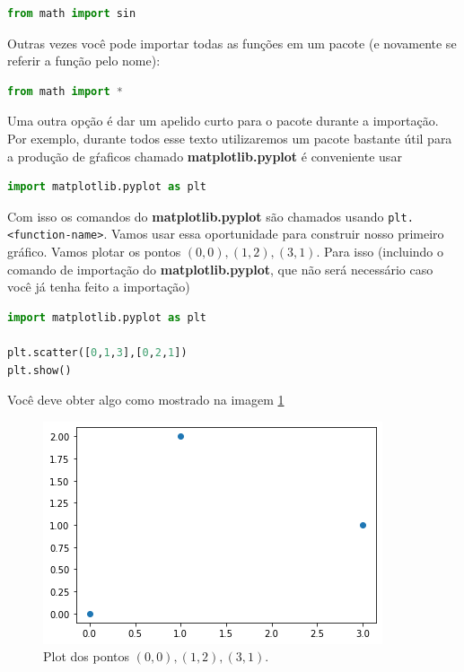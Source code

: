  \begin{lstlisting}[language=Python]
from math import sin
\end{lstlisting}

Outras vezes você pode importar todas as funções em um pacote (e novamente se referir a função pelo nome):

 \begin{lstlisting}[language=Python]
from math import *
\end{lstlisting}

Uma outra opção é dar um apelido curto para o pacote durante a importação. Por exemplo, durante todos esse texto utilizaremos um pacote bastante útil para a produção de gŕaficos chamado {\bf matplotlib.pyplot} é conveniente usar
\begin{lstlisting}[language=Python]
import matplotlib.pyplot as plt
\end{lstlisting}
Com isso os comandos do {\bf matplotlib.pyplot} são chamados usando {\tt plt.<function-name>}. Vamos usar essa oportunidade para construir nosso primeiro gráfico. Vamos plotar os pontos $(0,0), (1,2), (3,1)$. Para isso (incluindo o comando de importação do {\bf matplotlib.pyplot}, que não será necessário caso você já tenha feito a importação)

\begin{lstlisting}[language=Python]
import matplotlib.pyplot as plt

plt.scatter([0,1,3],[0,2,1])
plt.show()
\end{lstlisting}
Você deve obter algo como mostrado na imagem \ref{fig:first-plot}

\begin{figure}
    \centering
    \includegraphics{Images/first plot.png}
    \caption{Plot dos pontos $(0,0), (1,2), (3,1)$. }
    \label{fig:first-plot}
\end{figure}

